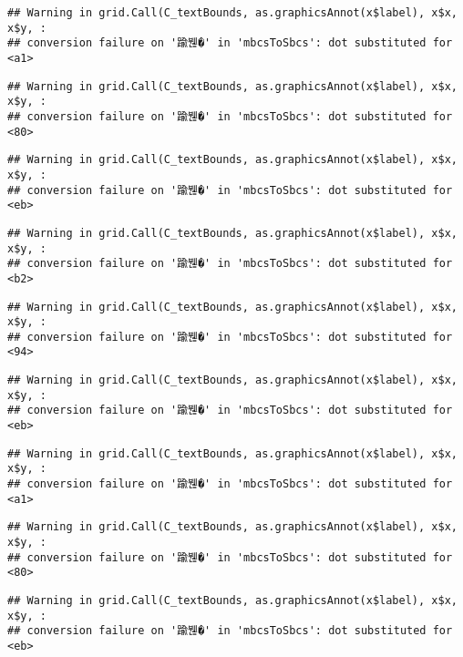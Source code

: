 \documentclass[
]{article}
\begin{document}
\begin{verbatim}
## Warning in grid.Call(C_textBounds, as.graphicsAnnot(x$label), x$x, x$y, :
## conversion failure on '踰붾�' in 'mbcsToSbcs': dot substituted for <a1>
\end{verbatim}

\begin{verbatim}
## Warning in grid.Call(C_textBounds, as.graphicsAnnot(x$label), x$x, x$y, :
## conversion failure on '踰붾�' in 'mbcsToSbcs': dot substituted for <80>
\end{verbatim}

\begin{verbatim}
## Warning in grid.Call(C_textBounds, as.graphicsAnnot(x$label), x$x, x$y, :
## conversion failure on '踰붾�' in 'mbcsToSbcs': dot substituted for <eb>
\end{verbatim}

\begin{verbatim}
## Warning in grid.Call(C_textBounds, as.graphicsAnnot(x$label), x$x, x$y, :
## conversion failure on '踰붾�' in 'mbcsToSbcs': dot substituted for <b2>
\end{verbatim}

\begin{verbatim}
## Warning in grid.Call(C_textBounds, as.graphicsAnnot(x$label), x$x, x$y, :
## conversion failure on '踰붾�' in 'mbcsToSbcs': dot substituted for <94>
\end{verbatim}

\begin{verbatim}
## Warning in grid.Call(C_textBounds, as.graphicsAnnot(x$label), x$x, x$y, :
## conversion failure on '踰붾�' in 'mbcsToSbcs': dot substituted for <eb>
\end{verbatim}

\begin{verbatim}
## Warning in grid.Call(C_textBounds, as.graphicsAnnot(x$label), x$x, x$y, :
## conversion failure on '踰붾�' in 'mbcsToSbcs': dot substituted for <a1>
\end{verbatim}

\begin{verbatim}
## Warning in grid.Call(C_textBounds, as.graphicsAnnot(x$label), x$x, x$y, :
## conversion failure on '踰붾�' in 'mbcsToSbcs': dot substituted for <80>
\end{verbatim}

\begin{verbatim}
## Warning in grid.Call(C_textBounds, as.graphicsAnnot(x$label), x$x, x$y, :
## conversion failure on '踰붾�' in 'mbcsToSbcs': dot substituted for <eb>
\end{verbatim}
\end{document}
